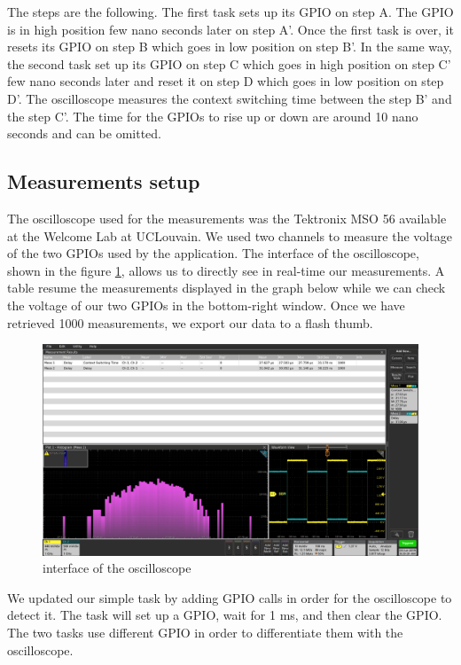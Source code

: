 The steps are the following.
The first task sets up its GPIO on step A.
The GPIO is in high position few nano seconds later on step A'.
Once the first task is over, it resets its GPIO on step B which goes in low position on step B'.
In the same way, the second task set up its GPIO on step C which goes in high position on step C' few nano seconds later and reset it on step D which goes in low position on step D'.
The oscilloscope measures the context switching time between the step B' and the step C'.
The time for the GPIOs to rise up or down are around 10 nano seconds and can be omitted.


\subsection{Measurements setup\label{sec:measurement-setup}}

The oscilloscope used for the measurements was the Tektronix MSO 56\cite{mso56} available at the Welcome Lab at UCLouvain.
We used two channels to measure the voltage of the two GPIOs used by the application.
The interface of the oscilloscope, shown in the figure \ref{fig:oscilloscope-interface}, allows us to directly see in real-time our measurements.
A table resume the measurements displayed in the graph below while we can check the voltage of our two GPIOs in the bottom-right window.
Once we have retrieved 1000 measurements, we export our data to a flash thumb.

\begin{figure}[!ht]
    \centering
    \includegraphics[scale=0.25]{assets/oscilloscope-interface.png}
    \caption{interface of the oscilloscope\label{fig:oscilloscope-interface}}
\end{figure}

We updated our simple task by adding GPIO calls in order for the oscilloscope to detect it.
The task will set up a GPIO, wait for 1 ms, and then clear the GPIO.
The two tasks use different GPIO in order to differentiate them with the oscilloscope.

